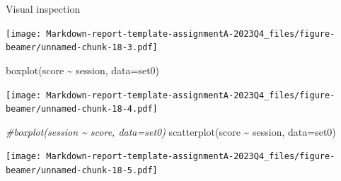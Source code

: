 \documentclass[
  ignorenonframetext,
]{beamer}
\newenvironment{Shaded}{\begin{snugshade}}{\end{snugshade}}
\newcommand{\AttributeTok}[1]{\textcolor[rgb]{0.77,0.63,0.00}{#1}}
\newcommand{\CommentTok}[1]{\textcolor[rgb]{0.56,0.35,0.01}{\textit{#1}}}
\newcommand{\DecValTok}[1]{\textcolor[rgb]{0.00,0.00,0.81}{#1}}
\newcommand{\FloatTok}[1]{\textcolor[rgb]{0.00,0.00,0.81}{#1}}
\newcommand{\FunctionTok}[1]{\textcolor[rgb]{0.00,0.00,0.00}{#1}}
\newcommand{\NormalTok}[1]{#1}
\newcommand{\OtherTok}[1]{\textcolor[rgb]{0.56,0.35,0.01}{#1}}
\newcommand{\SpecialCharTok}[1]{\textcolor[rgb]{0.00,0.00,0.00}{#1}}
\newcommand{\StringTok}[1]{\textcolor[rgb]{0.31,0.60,0.02}{#1}}
\begin{document}
\begin{frame}[fragile]{Visual inspection}
\begin{Shaded}
\end{Shaded}

\texttt{[image: Markdown-report-template-assignmentA-2023Q4\_files/figure-beamer/unnamed-chunk-18-3.pdf]}

\begin{Shaded}
\begin{Highlighting}[]
\FunctionTok{boxplot}\NormalTok{(score }\SpecialCharTok{\textasciitilde{}}\NormalTok{ session, }\AttributeTok{data=}\NormalTok{set0)}
\end{Highlighting}
\end{Shaded}

\texttt{[image: Markdown-report-template-assignmentA-2023Q4\_files/figure-beamer/unnamed-chunk-18-4.pdf]}

\begin{Shaded}
\begin{Highlighting}[]
\CommentTok{\#boxplot(session \textasciitilde{} score, data=set0)}
\FunctionTok{scatterplot}\NormalTok{(score }\SpecialCharTok{\textasciitilde{}}\NormalTok{ session, }\AttributeTok{data=}\NormalTok{set0)}
\end{Highlighting}
\end{Shaded}

\texttt{[image: Markdown-report-template-assignmentA-2023Q4\_files/figure-beamer/unnamed-chunk-18-5.pdf]}


\end{frame}
\end{document}
